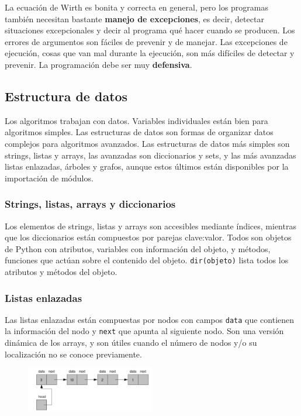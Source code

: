 La ecuación de Wirth es bonita y correcta en general, pero los programas también necesitan bastante \textbf{manejo de excepciones}, es decir, detectar situaciones excepcionales y decir al programa qué hacer cuando se producen. Los errores de argumentos son fáciles de prevenir y de manejar. Las excepciones de ejecución, cosas que van mal durante la ejecución, son más difíciles de detectar y prevenir. La programación debe ser muy \textbf{defensiva}.

\subsection{Estructura de datos}
Los algoritmos trabajan con datos. Variables individuales están bien para algoritmos simples. Las estructuras de datos son formas de organizar datos complejos para algoritmos avanzados. Las estructuras de datos más simples son strings, listas y arrays, las avanzadas son diccionarios y sets, y las más avanzadas listas enlazadas, árboles y grafos, aunque estos últimos están disponibles por la importación de módulos.

\subsubsection{Strings, listas, arrays y diccionarios}
Los elementos de strings, listas y arrays son accesibles mediante índices, mientras que los diccionarios están compuestos por parejas clave:valor. Todos son objetos de Python con atributos, variables con información del objeto, y métodos, funciones que actúan sobre el contenido del objeto. \texttt{dir(objeto)} lista todos los atributos y métodos del objeto.

\subsubsection{Listas enlazadas}
Las listas enlazadas están compuestas por nodos con campos \texttt{data} que contienen la información del nodo y \texttt{next} que apunta al siguiente nodo. Son una versión dinámica de los arrays, y son útiles cuando el número de nodos y/o su localización no se conoce previamente.

\begin{figure}[htbp]
\centering
\includegraphics[width = 0.5\textwidth]{figs/linked-lists.png}
\end{figure}

